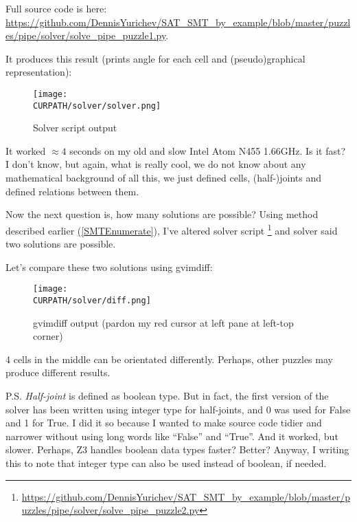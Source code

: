 Full source code is here: \url{https://github.com/DennisYurichev/SAT_SMT_by_example/blob/master/puzzles/pipe/solver/solve_pipe_puzzle1.py}.

It produces this result (prints angle for each cell and (pseudo)graphical representation):

\begin{figure}[H]
\centering
\texttt{[image: \\CURPATH/solver/solver.png]}
\caption{Solver script output}
\end{figure}

It worked $\approx 4$ seconds on my old and slow Intel Atom N455 1.66GHz.
Is it fast? I don't know, but again, what is really cool, we do not know about any mathematical background
of all this, we just defined cells, (half-)joints and defined relations between them.

Now the next question is, how many solutions are possible?
Using method described earlier (\ref{SMTEnumerate}), I've altered solver script
\footnote{\url{https://github.com/DennisYurichev/SAT_SMT_by_example/blob/master/puzzles/pipe/solver/solve_pipe_puzzle2.py}} and solver
said two solutions are possible.

Let's compare these two solutions using gvimdiff:

\begin{figure}[H]
\centering
\texttt{[image: \\CURPATH/solver/diff.png]}
\caption{gvimdiff output (pardon my red cursor at left pane at left-top corner)}
\end{figure}

4 cells in the middle can be orientated differently.
Perhaps, other puzzles may produce different results.

P.S.
\emph{Half-joint} is defined as boolean type.
But in fact, the first version of the solver has been written using integer type for half-joints,
and 0 was used for False and 1 for True.
I did it so because I wanted to make source code tidier and narrower without using long words like ``False'' and ``True''.
And it worked, but slower. Perhaps, Z3 handles boolean data types faster? Better?
Anyway, I writing this to note that integer type can also be used instead of boolean, if needed.


